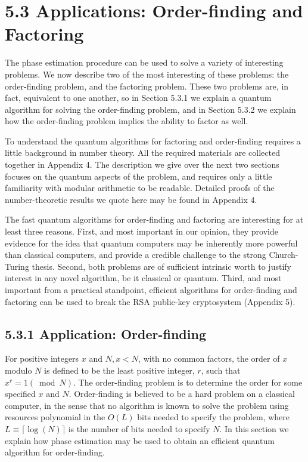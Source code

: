 \section{5.3 Applications: Order-finding and Factoring}

The phase estimation procedure can be used to solve a variety of interesting problems. We now describe two of the most interesting of these problems: the order-finding problem, and the factoring problem. These two problems are, in fact, equivalent to one another, so in Section 5.3.1 we explain a quantum algorithm for solving the order-finding problem, and in Section 5.3.2 we explain how the order-finding problem implies the ability to factor as well.

To understand the quantum algorithms for factoring and order-finding requires a little background in number theory. All the required materials are collected together in Appendix 4. The description we give over the next two sections focuses on the quantum aspects of the problem, and requires only a little familiarity with modular arithmetic to be readable. Detailed proofs of the number-theoretic results we quote here may be found in Appendix 4.

The fast quantum algorithms for order-finding and factoring are interesting for at least three reasons. First, and most important in our opinion, they provide evidence for the idea that quantum computers may be inherently more powerful than classical computers, and provide a credible challenge to the strong Church-Turing thesis. Second, both problems are of sufficient intrinsic worth to justify interest in any novel algorithm, be it classical or quantum. Third, and most important from a practical standpoint, efficient algorithms for order-finding and factoring can be used to break the RSA public-key cryptosystem (Appendix 5).

\subsection{5.3.1 Application: Order-finding}

For positive integers $x$ and $N, x<N$, with no common factors, the order of $x$ modulo $N$ is defined to be the least positive integer, $r$, such that $x^{r}=1(\bmod N)$. The order-finding problem is to determine the order for some specified $x$ and $N$. Order-finding is believed to be a hard problem on a classical computer, in the sense that no algorithm is known to solve the problem using resources polynomial in the $O(L)$ bits needed to specify the problem, where $L \equiv\lceil\log (N)\rceil$ is the number of bits needed to specify $N$. In this section we explain how phase estimation may be used to obtain an efficient quantum algorithm for order-finding.

